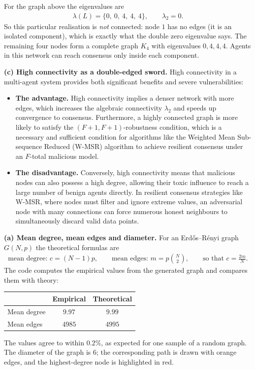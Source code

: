 \documentclass[a4paper, 11pt]{article}
\begin{document}
\begin{solution}
For the graph above the eigenvalues are
\begin{align*}
    \lambda(L) = \{0,\ 0,\ 4,\ 4,\ 4\}, \qquad \lambda_2 = 0.
\end{align*}
So this particular realisation is \emph{not} connected: node $1$ has no edges (it is an isolated component), which is exactly what the double zero eigenvalue says. The remaining four nodes form a complete graph $K_4$ with eigenvalues $0,4,4,4$. Agents in this network can reach consensus only inside each component.

\noindent\textbf{(c) High connectivity as a double-edged sword.}
High connectivity in a multi-agent system provides both significant benefits and severe vulnerabilities:
\begin{itemize}
    \item \textbf{The advantage.} High connectivity implies a denser network with more edges, which increases the algebraic connectivity $\lambda_2$ and speeds up convergence to consensus. Furthermore, a highly connected graph is more likely to satisfy the $(F+1,F+1)$-robustness condition, which is a necessary and sufficient condition for algorithms like the Weighted Mean Sub-sequence Reduced (W-MSR) algorithm to achieve resilient consensus under an $F$-total malicious model.
    \item \textbf{The disadvantage.} Conversely, high connectivity means that malicious nodes can also possess a high degree, allowing their toxic influence to reach a large number of benign agents directly. In resilient consensus strategies like W-MSR, where nodes must filter and ignore extreme values, an adversarial node with many connections can force numerous honest neighbours to simultaneously discard valid data points.
\end{itemize}


\noindent\textbf{(a) Mean degree, mean edges and diameter.}
For an Erd\H{o}s--R\'enyi graph $G(N,p)$ the theoretical formulas are
\begin{align*}
    \text{mean degree: } c = (N-1)p, \qquad \text{mean edges: } m = p\binom{N}{2}, \qquad \text{so that } c = \frac{2m}{N}.
\end{align*}
The code computes the empirical values from the generated graph and compares them with theory:
\begin{center}
\begin{tabular}{lcc}
\hline
 & Empirical & Theoretical \\
\hline
Mean degree & $9.97$ & $9.99$ \\
Mean edges & $4985$ & $4995$ \\
\hline
\end{tabular}
\end{center}
The values agree to within $0.2\%$, as expected for one sample of a random graph. The diameter of the graph is $6$; the corresponding path is drawn with orange edges, and the highest-degree node is highlighted in red.


\end{solution}
\end{document}
